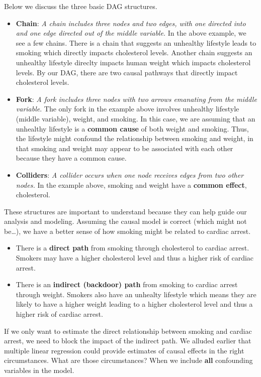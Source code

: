 \documentclass[
]{book}
\providecommand{\tightlist}{%
  \setlength{\itemsep}{0pt}\setlength{\parskip}{0pt}}
\begin{document}
Below we discuss the three basic DAG structures.

\begin{itemize}
\item
  \textbf{Chain}: \emph{A chain includes three nodes and two edges, with one directed into and one edge directed out of the middle variable.} In the above example, we see a few chains. There is a chain that suggests an unhealthy lifestyle leads to smoking which directly impacts cholesterol levels. Another chain suggests an unhealthy lifestyle direclty impacts human weight which impacts cholesterol levels. By our DAG, there are two causal pathways that directly impact cholesterol levels.
\item
  \textbf{Fork}: \emph{A fork includes three nodes with two arrows emanating from the middle variable}. The only fork in the example above involves unhealthy lifestyle (middle variable), weight, and smoking. In this case, we are assuming that an unhealthy lifestyle is a \textbf{common cause} of both weight and smoking. Thus, the lifestyle might confound the relationship between smoking and weight, in that smoking and weight may appear to be associated with each other because they have a common cause.
\item
  \textbf{Colliders}: \emph{A collider occurs when one node receives edges from two other nodes.} In the example above, smoking and weight have a \textbf{common effect}, cholesterol.
\end{itemize}

These structures are important to understand because they can help guide our analysis and modeling. Assuming the causal model is correct (which might not be\ldots), we have a better sense of how smoking might be related to cardiac arrest.

\begin{itemize}
\tightlist
\item
  There is a \textbf{direct path} from smoking through cholesterol to cardiac arrest. Smokers may have a higher cholesterol level and thus a higher risk of cardiac arrest.
\item
  There is an \textbf{indirect (backdoor) path} from smoking to cardiac arrest through weight. Smokers also have an unhealty lifestyle which means they are likely to have a higher weight leading to a higher cholesterol level and thus a higher risk of cardiac arrest.
\end{itemize}

If we only want to estimate the direct relationship between smoking and cardiac arrest, we need to block the impact of the indirect path. We alluded earlier that multiple linear regression could provide estimates of causal effects in the right circumstances. What are those circumstances? When we include \textbf{all} confounding variables in the model.
\end{document}
